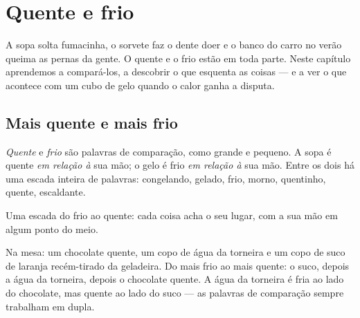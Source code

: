 \chapter{Quente e frio}\label{ch:g1:hot-and-cold}

A sopa solta fumacinha, o sorvete faz o dente doer e o banco do carro
no verão queima as pernas da gente. O quente e o frio estão em toda
parte. Neste capítulo aprendemos a compará-los, a descobrir o que
esquenta as coisas --- e a ver o que acontece com um cubo de gelo
quando o calor ganha a disputa.

\section{Mais quente e mais frio}

\begin{definition}\label{def:g1:hot-and-cold:words}
\emph{Quente} e \emph{frio} são palavras de
comparação, como grande e pequeno. A sopa é quente \emph{em relação
à} sua mão; o gelo é frio \emph{em relação à} sua mão. Entre os dois
há uma escada inteira de palavras: congelando, gelado, frio, morno,
quentinho, quente, escaldante.
\end{definition}

\begin{omfigure}

{\small Uma escada do frio ao quente: cada coisa acha o seu lugar, com
a sua mão em algum ponto do meio.}
\end{omfigure}

\begin{example}\label{ex:g1:hot-and-cold:drinks}
Na mesa: um chocolate quente, um copo de água da torneira e um copo
de suco de laranja recém-tirado da geladeira. Do mais frio ao mais
quente: o suco, depois a água da torneira, depois o chocolate quente.
A água da torneira é fria ao lado do chocolate, mas quente ao lado do
suco --- as palavras de comparação sempre trabalham em dupla.
\end{example}

